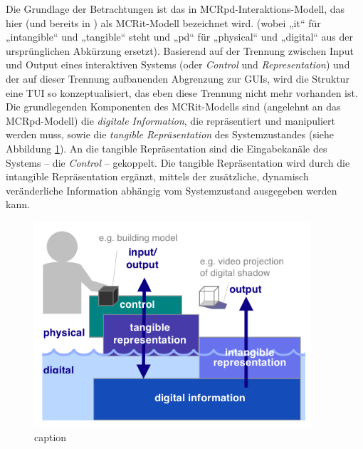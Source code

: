 Die Grundlage der Betrachtungen ist das in \citep{Ullmer00} MCRpd-Interaktions-Modell, das hier (und bereits in \citep{Ullmer05}) als \gls{MCRit}-Modell bezeichnet wird. (wobei „it“ für „intangible“ und „tangible“ steht und „pd“ für „physical“ und „digital“ aus der ursprünglichen Abkürzung ersetzt). Basierend auf der Trennung zwischen Input und Output eines interaktiven Systems (oder \emph{Control} und \emph{Representation}) und der auf dieser Trennung aufbauenden Abgrenzung zur \glspl{GUI}, wird die Struktur eine \gls{TUI} so konzeptualisiert, das eben diese Trennung nicht mehr vorhanden ist. Die grundlegenden Komponenten des \gls{MCRit}-Modells sind (angelehnt an das \gls{MCRpd}-Modell) die \emph{digitale Information}, die repräsentiert und manipuliert werden muss, sowie die \emph{tangible Repräsentation} des Systemzustandes (siehe Abbildung \ref{fig:img_ImplementierungUeberblick_MCRit}). An die tangible Repräsentation sind die Eingabekanäle des Systems -- die \emph{Control} -- gekoppelt. Die tangible Repräsentation wird durch die intangible Repräsentation ergänzt, mittels der zusätzliche, dynamisch veränderliche Information abhängig vom Systemzustand ausgegeben werden kann.

\begin{figure}[htbp]
	\centering
		\includegraphics[height=3in]{img/ImplementierungUeberblick/MCRit.png}
	\caption{caption}
	\label{fig:img_ImplementierungUeberblick_MCRit}
\end{figure}

